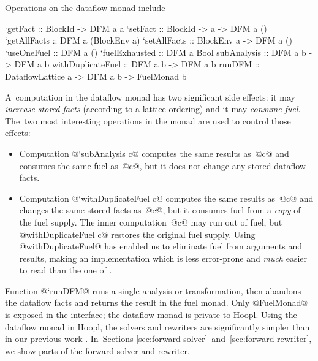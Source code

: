 \documentclass[blockstyle,preprint,natbib,nocopyrightspace]{sigplanconf}
\newcommand\ourlib{Hoopl}  %
\let\cite\citep
\def\authornote#1{\unskip\relax}
\newcommand{\john}[1]{\authornote{JD: #1}}
\newcommand\secreftwo[2]{Sections \ref{sec:#1}~and~\ref{sec:#2}}
\begin{document}
Operations on the dataflow monad include
\begin{code}
`getFact           :: BlockId ->      DFM a a
`setFact           :: BlockId -> a -> DFM a ()
`getAllFacts       :: DFM a (BlockEnv a)
`setAllFacts       :: BlockEnv a -> DFM a ()
`useOneFuel        :: DFM a ()
`fuelExhausted     :: DFM a Bool
subAnalysis       :: DFM a b -> DFM a b
withDuplicateFuel :: DFM a b -> DFM a b
runDFM :: DataflowLattice a -> DFM a b -> FuelMonad b
\end{code}
A~computation in the dataflow monad has two significant side effects:
it may \emph{increase stored facts} (according to a lattice ordering)
and it may \emph{consume fuel}.
The~two most interesting operations in the monad are used to control
those effects:
\begin{itemize}
\item
Computation @`subAnalysis c@ computes the same results as~@c@ and
consumes the same fuel as~@c@, but it does not change any stored
dataflow facts.
\item
Computation @`withDuplicateFuel c@ computes the same results as~@c@ and
changes the same stored facts as~@c@, but it consumes fuel from a
\emph{copy} of the fuel supply.
The inner computation~@c@ may run out of fuel, but
@withDuplicateFuel c@ restores the original fuel supply.
Using @withDuplicateFuel@ has enabled us to eliminate fuel from
arguments and results, making an implementation which
is less error-prone and \emph{much} easier to
read than the one of \citet{ramsey-dias:applicative-flow-graph}. 
\end{itemize}
Function @`runDFM@ runs a single analysis or transformation, then
abandons the dataflow facts and returns the result in the fuel monad.
Only @FuelMonad@ is exposed in the interface;
the dataflow monad is private to \ourlib.
Using the dataflow monad in \ourlib, the solvers and rewriters
are significantly simpler than in our
previous work \cite{ramsey-dias:applicative-flow-graph}.
In~\secreftwo{forward-solver}{forward-rewriter},
we show parts of the forward solver and rewriter. 


\end{document}
